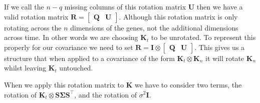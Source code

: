 If we call the $n-q$ missing columns of this rotation matrix $\mathbf{U}$ then we have a valid rotation matrix $\mathbf{R}=\begin{bmatrix} \mathbf{Q}& \mathbf{U}\end{bmatrix}$. Although this rotation matrix is only rotating across the $n$ dimensions of the genes, not the additional dimensions across time. In other words we are choosing $\mathbf{K}_t$ to be unrotated. To represent this properly for our covariance we need to set $\mathbf{R} = \mathbf{I} \otimes \begin{bmatrix} \mathbf{Q}& \mathbf{U}\end{bmatrix}$. This gives us a structure that when applied to a covariance of the form $\mathbf{K}_t\otimes \mathbf{K}_n$ it will rotate $\mathbf{K}_n$ whilst leaving $\mathbf{K}_t$ untouched.

When we apply this rotation matrix to $\mathbf{K}$ we have to consider two terms, the rotation of $\mathbf{K}_t \otimes \mathbf{S}\boldsymbol{\Sigma}\mathbf{S}^\top$, and the rotation of $\sigma^2 \mathbf{I}$.

